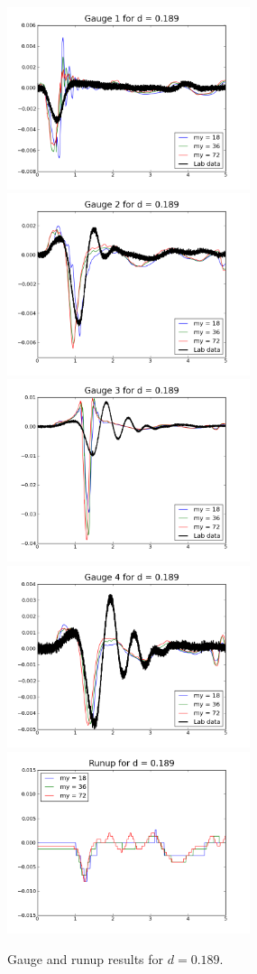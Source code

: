 \begin{figure}[ht]

\hfil\includegraphics[width=2.8in]{bp3/gauge1-d0-189.png}\hfil
\hfil\includegraphics[width=2.8in]{bp3/gauge2-d0-189.png}\hfil
\vskip 10pt
\hfil\includegraphics[width=2.8in]{bp3/gauge3-d0-189.png}\hfil
\hfil\includegraphics[width=2.8in]{bp3/gauge4-d0-189.png}\hfil
\vskip 10pt
\hfil\includegraphics[width=2.8in]{bp3/runup-d0-189.png}\hfil

\caption{\label{fig:bp3gauge7} 
Gauge and runup results for $d=0.189$.
  }
\end{figure}



